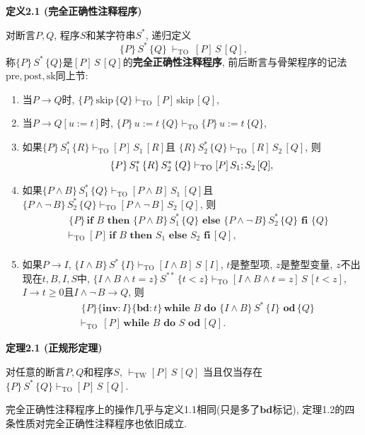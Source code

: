 \documentclass[UTF8]{ctexart}
\begin{document}
\hypertarget{sec:定义2.1}{}
\noindent\textbf{定义2.1 (完全正确性注释程序)}

对断言$P,Q$, 程序$S$和某字符串$S^*$, 递归定义
\[
    \{P\}\,S^*\,\{Q\}\ \vdash_{\mathrm{TO}}\ [P]\,S\,[Q],
\]
称$\{P\}\,S^*\,\{Q\}$是$[P]\,S\,[Q]$的\textbf{完全正确性注释程序},
前后断言与骨架程序的记法$\mathrm{pre},\mathrm{post},\mathrm{sk}$同上节:
\vspace{1pt}
\begin{enumerate}
    \item 当$P\to Q$时, $\{P\}\,\mathrm{skip}\,\{Q\}\vdash_{\mathrm{TO}}
    [P]\,\mathrm{skip}\,[Q]$,
    \item 当$P\to Q[u:=t]$时, $\{P\}\,u:=t\,\{Q\}\vdash_{\mathrm{TO}}
    \{P\}\,u:=t\,\{Q\}$,
    \item 如果$\{P\}\,S_1^*\,\{R\}\vdash_{\mathrm{TO}}[P]\,S_1\,[R]$且
    $\{R\}\,S_2^*\,\{Q\}\vdash_{\mathrm{TO}}[R]\,S_2\,[Q]$, 则
    \vspace{1pt}
    \[
        \{P\}\,S_1^*\,\{R\}\,S_2^*\,\{Q\}\vdash_{\mathrm{TO}}
        [P]\,S_1;S_2\,[Q],\\[1pt]
    \]
    \item 如果$\{P\land B\}\,S_1^*\,\{Q\}\vdash_{\mathrm{TO}}
    [P\land B]\,S_1\,[Q]$且$\{P\land\neg\,B\}\,S_2^*\,\{Q\}
    \vdash_{\mathrm{TO}}[P\land\neg\,B]\,S_2\,[Q]$, 则
    \vspace{1pt}
    \[\begin{aligned}
        &\,\,\{P\}\,\mathbf{if}\,\,B\,\,\mathbf{then}\,\,
        \{P\land B\}\,S_1^*\,\{Q\}\,\,\mathbf{else}\,\,\{P\land\neg\,B\}\,S_2^*
        \,\{Q\}\,\,\mathbf{fi}\,\,\{Q\}\\[-3pt]
        \,&\vdash_{\mathrm{TO}}[P]\,\mathbf{if}\,\,B\,\,\mathbf{then}\,\,S_1
        \,\,\mathbf{else}\,\,S_2\,\,\mathbf{fi}\,[Q],\\[2pt]
    \end{aligned}\]
    \item 如果$P\to I$, $\{I\land B\}\,S^*\,\{I\}
    \vdash_{\mathrm{TO}}[I\land B]\,S\,[I]$, $t$是整型项, $z$是整型变量,
    $z$不出现在$t,B,I,S$中, $\{I\land B\land t=z\}\,S^{**}\,\{t<z\}
    \vdash_{\mathrm{TO}}[I\land B\land t=z]\,S\,[t<z]$,
    $I\to t\geqslant 0$且$I\land\neg\,B\to Q$, 则
    \vspace{1pt}
    \[\begin{aligned}
        &\,\,\{P\}\{\mathbf{inv}:I\}\{\mathbf{bd}:t\}\,\mathbf{while}\,\,B\,\,
        \mathbf{do}\,\,\{I\land B\}\,S^*\,\{I\}
        \,\,\mathbf{od}\,\{Q\}\,\\[-3pt]
        \,&\vdash_{\mathrm{TO}}\,[P]\,\mathbf{while}\,\,B
        \,\,\mathbf{do}\,\,S\,\,\mathbf{od}\,[Q].
    \end{aligned}\]
\end{enumerate}

\vspace{15pt}

\hypertarget{sec:定理2.1}{}
\noindent\textbf{定理2.1 (正规形定理)}

对任意的断言$P,Q$和程序$S$, $\vdash_{\mathrm{TW}}[P]\,S\,[Q]$
当且仅当存在$\{P\}\,S^*\,\{Q\}\vdash_{\mathrm{TO}}[P]\,S\,[Q]$.

\vspace{15pt}

完全正确性注释程序上的操作几乎与定义1.1相同(只是多了$\mathbf{bd}$标记),
定理1.2的四条性质对完全正确性注释程序也依旧成立.
\end{document}
